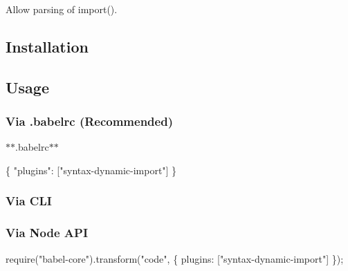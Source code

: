 Allow parsing of {\ttfamily import()}.

\subsection*{Installation}




\subsection*{Usage}

\subsubsection*{Via {\ttfamily .babelrc} (Recommended)}

$\ast$$\ast$.babelrc$\ast$$\ast$


\begin{DoxyCode}
\{
  "plugins": ["syntax-dynamic-import"]
\}
\end{DoxyCode}


\subsubsection*{Via C\+LI}




\subsubsection*{Via Node A\+PI}


\begin{DoxyCode}
require("babel-core").transform("code", \{
  plugins: ["syntax-dynamic-import"]
\});
\end{DoxyCode}
 